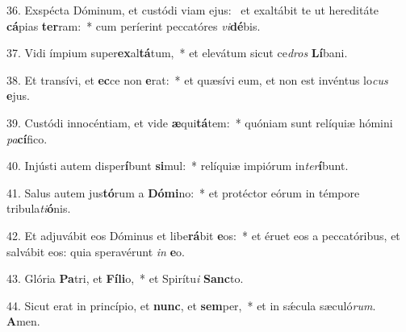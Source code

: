 36. Exspécta Dóminum, et custódi viam ejus: \dag\  et exaltábit te ut hereditáte \textbf{cá}pias \textbf{ter}ram:~*  cum períerint peccatóres \textit{vi}\textbf{dé}bis.\

37. Vidi ímpium super\textbf{ex}al\textbf{tá}tum,~*  et elevátum sicut ce\textit{dros} \textbf{Lí}bani.\

38. Et transívi, et \textbf{ec}ce non \textbf{e}rat:~*  et quæsívi eum, et non est invéntus lo\textit{cus} \textbf{e}jus.\

39. Custódi innocéntiam, et vide \textbf{æ}qui\textbf{tá}tem:~*  quóniam sunt relíquiæ hómini \textit{pa}\textbf{cí}fico.\

40. Injústi autem disper\textbf{í}bunt \textbf{si}mul:~*  relíquiæ impiórum in\textit{ter}\textbf{í}bunt.\

41. Salus autem jus\textbf{tó}rum a \textbf{Dó}\textbf{mi}no:~*  et protéctor eórum in témpore tribula\textit{ti}\textbf{ó}nis.\

42. Et adjuvábit eos Dóminus et libe\textbf{rá}bit \textbf{e}os:~*  et éruet eos a peccatóribus, et salvábit eos: quia speravérunt \textit{in} \textbf{e}o.\

43. Glória \textbf{Pa}tri, et \textbf{Fí}\textbf{li}o,~*  et Spirítu\textit{i} \textbf{Sanc}to.\

44. Sicut erat in princípio, et \textbf{nunc}, et \textbf{sem}per,~*  et in sǽcula sæculó\textit{rum}. \textbf{A}men.\

